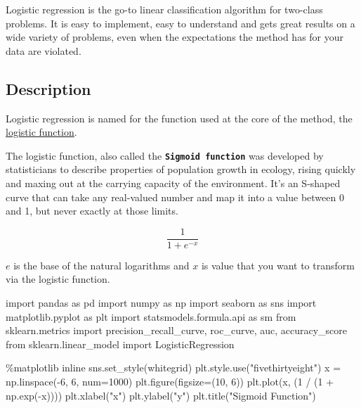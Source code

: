 \documentclass[
  letterpaper,
  DIV=11,
  numbers=noendperiod]{scrreprt}
\newenvironment{Shaded}{\begin{snugshade}}{\end{snugshade}}
\newcommand{\DecValTok}[1]{\textcolor[rgb]{0.68,0.00,0.00}{#1}}
\newcommand{\ImportTok}[1]{\textcolor[rgb]{0.00,0.46,0.62}{#1}}
\newcommand{\NormalTok}[1]{\textcolor[rgb]{0.00,0.23,0.31}{#1}}
\newcommand{\OperatorTok}[1]{\textcolor[rgb]{0.37,0.37,0.37}{#1}}
\newcommand{\StringTok}[1]{\textcolor[rgb]{0.13,0.47,0.30}{#1}}
\begin{document}
Logistic regression is the go-to linear classification algorithm for
two-class problems. It is easy to implement, easy to understand and gets
great results on a wide variety of problems, even when the expectations
the method has for your data are violated.

\subsection{Description}\label{description}

Logistic regression is named for the function used at the core of the
method, the
\href{https://en.wikipedia.org/wiki/Logistic_function}{logistic
function}.

The logistic function, also called the
\textbf{\texttt{Sigmoid\ function}} was developed by statisticians to
describe properties of population growth in ecology, rising quickly and
maxing out at the carrying capacity of the environment. It's an S-shaped
curve that can take any real-valued number and map it into a value
between 0 and 1, but never exactly at those limits.

\[\frac{1}{1 + e^{-x}}\]

\(e\) is the base of the natural logarithms and \(x\) is value that you
want to transform via the logistic function.

\begin{Shaded}
\begin{Highlighting}[]
\ImportTok{import}\NormalTok{ pandas }\ImportTok{as}\NormalTok{ pd}
\ImportTok{import}\NormalTok{ numpy }\ImportTok{as}\NormalTok{ np}
\ImportTok{import}\NormalTok{ seaborn }\ImportTok{as}\NormalTok{ sns}
\ImportTok{import}\NormalTok{ matplotlib.pyplot }\ImportTok{as}\NormalTok{ plt}
\ImportTok{import}\NormalTok{ statsmodels.formula.api }\ImportTok{as}\NormalTok{ sm}
\ImportTok{from}\NormalTok{ sklearn.metrics }\ImportTok{import}\NormalTok{ precision\_recall\_curve, roc\_curve, auc, accuracy\_score}
\ImportTok{from}\NormalTok{ sklearn.linear\_model }\ImportTok{import}\NormalTok{ LogisticRegression}
\end{Highlighting}
\end{Shaded}

\begin{Shaded}
\begin{Highlighting}[]
\OperatorTok{\%}\NormalTok{matplotlib inline}
\NormalTok{sns.set\_style(}\StringTok{\textquotesingle{}whitegrid\textquotesingle{}}\NormalTok{)}
\NormalTok{plt.style.use(}\StringTok{"fivethirtyeight"}\NormalTok{)}
\NormalTok{x }\OperatorTok{=}\NormalTok{ np.linspace(}\OperatorTok{{-}}\DecValTok{6}\NormalTok{, }\DecValTok{6}\NormalTok{, num}\OperatorTok{=}\DecValTok{1000}\NormalTok{)}
\NormalTok{plt.figure(figsize}\OperatorTok{=}\NormalTok{(}\DecValTok{10}\NormalTok{, }\DecValTok{6}\NormalTok{))}
\NormalTok{plt.plot(x, (}\DecValTok{1} \OperatorTok{/}\NormalTok{ (}\DecValTok{1} \OperatorTok{+}\NormalTok{ np.exp(}\OperatorTok{{-}}\NormalTok{x))))}
\NormalTok{plt.xlabel(}\StringTok{"x"}\NormalTok{)}
\NormalTok{plt.ylabel(}\StringTok{"y"}\NormalTok{)}
\NormalTok{plt.title(}\StringTok{"Sigmoid Function"}\NormalTok{)}
\end{Highlighting}
\end{Shaded}
\end{document}
